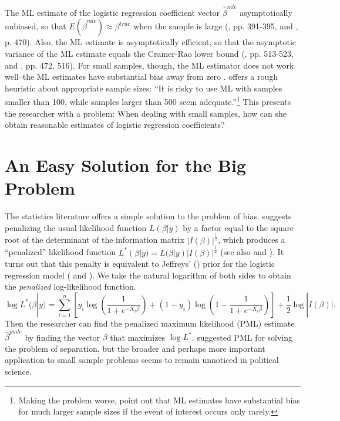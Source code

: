 \documentclass[12pt]{article}
\begin{document}
The ML estimate of the logistic regression coefficient vector $\hat{\beta}^{mle}$ asymptotically unbiased, so that $E(\hat{\beta}^{mle}) \approx \beta^{true}$ when the sample is large (\citealt{Wooldridge2002}, pp. 391-395, and \citealt{CasellaBerger2002}, p. 470). 
Also, the ML estimate is asymptotically efficient, so that the asymptotic variance of the ML estimate equals the Cramer-Rao lower bound (\citealt{Greene2012}, pp. 513-523, and \citealt{CasellaBerger2002}, pp. 472, 516). 
For small samples, though, the ML estimator does not work well--the ML estimates have substantial bias away from zero \citep[pp. 53-54]{Long1997}.
\citet[p. 54]{Long1997} offers a rough heuristic about appropriate sample sizes: ``It is risky to use ML with samples smaller than 100, while samples larger than 500 seem adequate.''\footnote{Making the problem worse, \cite{KingZeng2001} point out that ML estimates have substantial bias for much larger sample sizes if the event of interest occurs only rarely.}
This presents the researcher with a problem: When dealing with small samples, how can she obtain reasonable estimates of logistic regression coefficients?

\section*{An Easy Solution for the Big Problem}

The statistics literature offers a simple solution to the problem of bias.
\cite{Firth1993} suggests penalizing the usual likelihood function $L(\beta | y)$ by a factor equal to the square root of the determinant of the information matrix $|I(\beta)|^\frac{1}{2}$, which produces a ``penalized'' likelihood function $L^*(\beta | y) = L(\beta | y)|I(\beta)|^\frac{1}{2}$ (see also \citealt{KosmidisFirth2009} and \citealt{Kosmidis2014}).
It turns out that this penalty is equivalent to Jeffreys' (\citeyear{Jeffreys1946}) prior for the logistic regression model (\citealt{Firth1993} and \citealt{Poirier1994}).
We take the natural logarithm of both sides to obtain the \textit{penalized} log-likelihood function.
\begin{equation}\nonumber
\log L^*(\beta | y) = \displaystyle \sum_{i = 1}^n \left[y_i \log \left( \dfrac{1}{1 + e^{-X_i\beta}}\right) + (1 - y_i) \log \left(1 - \dfrac{1}{1 + e^{-X_i\beta}}\right)\right] + \dfrac{1}{2} \log |I(\beta)|.
\end{equation}
Then the researcher can find the penalized maximum likelihood (PML) estimate $\hat{\beta}^{pmle}$ by finding the vector $\beta$ that maximizes $\log L^*$.
\cite{Zorn2005} suggested PML for solving the problem of separation,
but the broader and perhaps more important application to small sample problems seems to remain unnoticed in political science.
\end{document}
